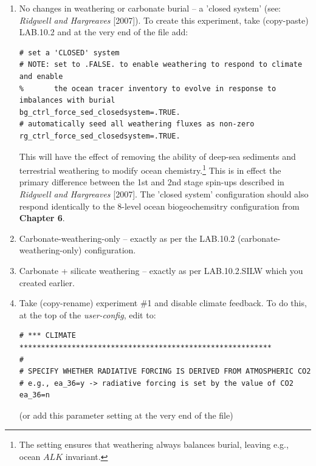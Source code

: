 \begin{enumerate}[noitemsep]

\vspace{1mm}
\item No changes in weathering or carbonate burial -- a 'closed system' (see: \textit{Ridgwell and Hargreaves} [2007]). To create this experiment, take (copy-paste) \textsf{\footnotesize LAB.10.2} and at the very end of the file add:
\vspace{-1mm}\small\begin{verbatim}
# set a 'CLOSED' system
# NOTE: set to .FALSE. to enable weathering to respond to climate and enable
%       the ocean tracer inventory to evolve in response to imbalances with burial
bg_ctrl_force_sed_closedsystem=.TRUE.
# automatically seed all weathering fluxes as non-zero
rg_ctrl_force_sed_closedsystem=.TRUE.
\end{verbatim}\normalsize\vspace{-1mm}
This will have the effect of removing the ability of deep-sea sediments and terrestrial weathering to modify ocean chemistry.\footnote{The setting ensures that weathering always balances burial, leaving e.g., ocean $ALK$ invariant.} This is in effect the primary difference between the 1st and 2nd stage spin-ups described in \textit{Ridgwell and Hargreaves} [2007]. The 'closed system' configuration should also respond identically to the 8-level ocean biogeochemsitry configuration from \textbf{Chapter 6}.

\vspace{1mm}
\item Carbonate-weathering-only -- exactly as per the \textsf{\footnotesize LAB.10.2} (carbonate-weathering-only) configuration.

\vspace{1mm}
\item Carbonate + silicate weathering -- exactly as per \textsf{\footnotesize LAB.10.2.SILW} which you created earlier.

\vspace{1mm}
\item Take (copy-rename) experiment \#1 and disable climate feedback. To do this, at the top of the \textit{user-config}, edit to:
\vspace{-0mm}\small\begin{verbatim}
# *** CLIMATE **********************************************************
#
# SPECIFY WHETHER RADIATIVE FORCING IS DERIVED FROM ATMOSPHERIC CO2	
# e.g., ea_36=y -> radiative forcing is set by the value of CO2
ea_36=n
\end{verbatim}\normalsize\vspace{-1mm}
(or add this parameter setting at the very end of the file)


\end{enumerate}
